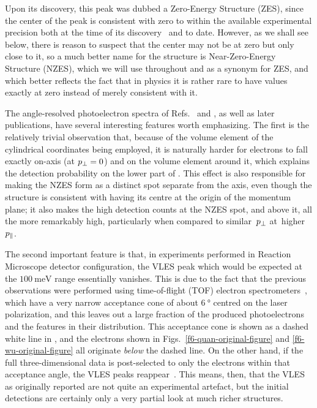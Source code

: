 Upon its discovery, this peak was dubbed a Zero-Energy Structure (ZES), since the center of the peak is consistent with zero to within the available experimental precision both at the time of its discovery~\cite{pullen_kinematically_2014} and to date. However, as we shall see below, there is reason to suspect that the center may not be at zero but only close to it, so a much better name for the structure is Near-Zero-Energy Structure (NZES), which we will use throughout and as a synonym for ZES, and which better reflects the fact that in physics it is rather rare to have values exactly at zero instead of merely consistent with it.


The angle-resolved photoelectron spectra of Refs.~\cite{dura_ionization_2013} and \cite{pullen_kinematically_2014}, as well as later publications, have several interesting features worth emphasizing. The first is the relatively trivial observation that, because of the volume element of the cylindrical coordinates being employed, it is naturally harder for electrons to fall exactly on-axis (at ${p_{\perp}}=0$) and on the volume element around it, which explains the detection probability on the lower part of . This effect is also responsible for making the NZES form as a distinct spot separate from the axis, even though the structure is consistent with having its centre at the origin of the momentum plane; it also makes the high detection counts at the NZES spot, and above it, all the more remarkably high, particularly when compared to similar~${p_{\perp}}$ at~higher ${p_{\parallel}}$.


The second important feature is that, in experiments performed in Reaction Microscope detector configuration, the VLES peak which would be expected at the $\SI{100}{\milli\electronvolt}$ range essentially vanishes. This is due to the fact that the previous observations were performed using time-of-flight (TOF) electron spectrometers~\cite{VLES_initial, VLES_characterization}, which have a very narrow acceptance cone of about $\SI{6}{\degree}$ centred on the laser polarization, and this leaves out a large fraction of the produced photoelectrons and the features in their distribution. This acceptance cone is shown as a dashed white line in , and the electrons shown in Figs.~\ref{f6-quan-original-figure} and \ref{f6-wu-original-figure} all originate \textit{below} the dashed line. On the other hand, if the full three-dimensional data is post-selected to only the electrons within that acceptance angle, the VLES peaks reappear~\cite[p.~5]{pullen_kinematically_2014}. This means, then, that the VLES as originally reported are not quite an experimental artefact, but the initial detections are certainly only a very partial look at much richer structures.

